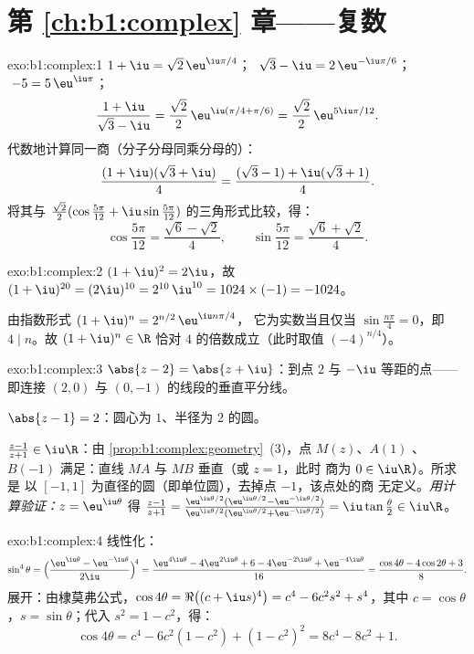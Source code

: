 \section*{第 \ref{ch:b1:complex} 章——复数}

\begin{solution}{exo:b1:complex:1}
$1 + \iu = \sqrt 2\, \eu^{\iu\pi/4}$；
$\;\sqrt 3 - \iu = 2\, \eu^{-\iu\pi/6}$；
$\;-5 = 5\, \eu^{\iu\pi}$；
\[
\frac{1 + \iu}{\sqrt 3 - \iu}
= \frac{\sqrt 2}{2}\, \eu^{\iu(\pi/4 + \pi/6)}
= \frac{\sqrt 2}{2}\, \eu^{5\iu\pi/12}.
\]
代数地计算同一商（分子分母同乘分母的）：
\[
\frac{(1 + \iu)(\sqrt 3 + \iu)}{4}
= \frac{(\sqrt 3 - 1) + \iu(\sqrt 3 + 1)}{4}.
\]
将其与 $\frac{\sqrt 2}{2}(\cos\frac{5\pi}{12} +
\iu\sin\frac{5\pi}{12})$ 的三角形式比较，得：
\[
\cos\frac{5\pi}{12} = \frac{\sqrt 6 - \sqrt 2}{4},
\qquad
\sin\frac{5\pi}{12} = \frac{\sqrt 6 + \sqrt 2}{4}.
\]
\end{solution}

\begin{solution}{exo:b1:complex:2}
$(1+\iu)^2 = 2\iu$，故 $(1+\iu)^{20} = (2\iu)^{10} = 2^{10}\,\iu^{10}
= 1024 \times (-1) = -1024$。

由指数形式 $(1+\iu)^n = 2^{n/2}\, \eu^{\iu n\pi/4}$，
它为实数当且仅当 $\sin\frac{n\pi}{4} = 0$，即 $4 \mid n$。故 $(1+\iu)^n
\in \R$ 恰对 $4$ 的倍数成立（此时取值 $(-4)^{n/4}$）。
\end{solution}

\begin{solution}{exo:b1:complex:3}
$\abs{z - 2} = \abs{z + \iu}$：到点 $2$ 与
$-\iu$ 等距的点——即连接 $(2, 0)$
与 $(0, -1)$ 的线段的垂直平分线。

$\abs{z - 1} = 2$：圆心为 $1$、半径为 $2$ 的圆。

$\frac{z-1}{z+1} \in \iu\R$：由
\cref{prop:b1:complex:geometry}~(3)，点 $M(z)$、$A(1)$
、$B(-1)$ 满足：直线 $MA$ 与 $MB$ 垂直（或 $z = 1$，此时
商为 $0 \in \iu\R$）。所求是
以 $[-1, 1]$ 为直径的圆（即单位圆），去掉点 $-1$，该点处的商
无定义。\emph{用计算验证：}$z = \eu^{\iu\theta}$ 得
$\frac{z-1}{z+1} = \frac{\eu^{\iu\theta/2}(\eu^{\iu\theta/2} -
\eu^{-\iu\theta/2})}{\eu^{\iu\theta/2}(\eu^{\iu\theta/2} +
\eu^{-\iu\theta/2})} = \iu\tan\frac\theta2 \in \iu\R$。
\end{solution}

\begin{solution}{exo:b1:complex:4}
线性化：
\[
\sin^4\theta
= \Bigl(\frac{\eu^{\iu\theta} - \eu^{-\iu\theta}}{2\iu}\Bigr)^{\!4}
= \frac{\eu^{4\iu\theta} - 4\eu^{2\iu\theta} + 6 - 4\eu^{-2\iu\theta}
+ \eu^{-4\iu\theta}}{16}
= \frac{\cos 4\theta - 4\cos 2\theta + 3}{8}.
\]
展开：由棣莫弗公式，$\cos 4\theta = \Re\bigl((c +
\iu s)^4\bigr) = c^4 - 6c^2 s^2 + s^4$，其中 $c = \cos\theta$，$s =
\sin\theta$；代入 $s^2 = 1 - c^2$，得：
\[
\cos 4\theta = c^4 - 6c^2(1 - c^2) + (1 - c^2)^2
= 8c^4 - 8c^2 + 1 .
\]
\end{solution}

